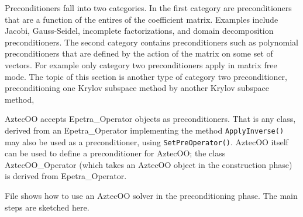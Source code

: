 Preconditioners fall into two categories.
In the first category 
are preconditioners that are a function of the entires of the coefficient matrix.
Examples include Jacobi, Gauss-Seidel, incomplete factorizations, and domain
decomposition preconditioners.
The second category contains preconditioners 
such as polynomial preconditioners
that are defined by the action of
the matrix on some set of vectors.
For example only category two preconditioners apply in matrix free mode.
The topic of this section is another type of category two preconditioner, 
preconditioning one Krylov subspace method by another Krylov subspace method, 

AztecOO accepts Epetra\_Operator objects as preconditioners. That is
any class, derived from an Epetra\_Operator implementing the
method \verb!ApplyInverse()! may also be used as a preconditioner,
using \verb!SetPreOperator()!. AztecOO itself can be used to define a
preconditioner for AztecOO; the class AztecOO\_Operator (which takes an
AztecOO object in the construction phase) is derived from
Epetra\_Operator.

File  shows how to use an AztecOO solver in the
preconditioning phase.  The main steps are sketched here.

